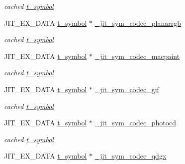 \begin{DoxyCompactItemize}
\begin{DoxyCompactList}\small\item\em cached \hyperlink{structt__symbol}{t\_\-symbol} \item\end{DoxyCompactList}\item 
\hypertarget{group__jitter_ga9e3f5e410192f5386c8ec75b49aa4c5d}{
JIT\_\-EX\_\-DATA \hyperlink{structt__symbol}{t\_\-symbol} $\ast$ \hyperlink{group__jitter_ga9e3f5e410192f5386c8ec75b49aa4c5d}{\_\-jit\_\-sym\_\-codec\_\-planarrgb}}
\label{group__jitter_ga9e3f5e410192f5386c8ec75b49aa4c5d}

\begin{DoxyCompactList}\small\item\em cached \hyperlink{structt__symbol}{t\_\-symbol} \item\end{DoxyCompactList}\item 
\hypertarget{group__jitter_gae0f1922f59cfbe91eb5750726d67df7e}{
JIT\_\-EX\_\-DATA \hyperlink{structt__symbol}{t\_\-symbol} $\ast$ \hyperlink{group__jitter_gae0f1922f59cfbe91eb5750726d67df7e}{\_\-jit\_\-sym\_\-codec\_\-macpaint}}
\label{group__jitter_gae0f1922f59cfbe91eb5750726d67df7e}

\begin{DoxyCompactList}\small\item\em cached \hyperlink{structt__symbol}{t\_\-symbol} \item\end{DoxyCompactList}\item 
\hypertarget{group__jitter_gadd374220c19455f5e7dfca29bf09c36b}{
JIT\_\-EX\_\-DATA \hyperlink{structt__symbol}{t\_\-symbol} $\ast$ \hyperlink{group__jitter_gadd374220c19455f5e7dfca29bf09c36b}{\_\-jit\_\-sym\_\-codec\_\-gif}}
\label{group__jitter_gadd374220c19455f5e7dfca29bf09c36b}

\begin{DoxyCompactList}\small\item\em cached \hyperlink{structt__symbol}{t\_\-symbol} \item\end{DoxyCompactList}\item 
\hypertarget{group__jitter_gae852f97ee9b1de24e37c95b504bb6486}{
JIT\_\-EX\_\-DATA \hyperlink{structt__symbol}{t\_\-symbol} $\ast$ \hyperlink{group__jitter_gae852f97ee9b1de24e37c95b504bb6486}{\_\-jit\_\-sym\_\-codec\_\-photocd}}
\label{group__jitter_gae852f97ee9b1de24e37c95b504bb6486}

\begin{DoxyCompactList}\small\item\em cached \hyperlink{structt__symbol}{t\_\-symbol} \item\end{DoxyCompactList}\item 
\hypertarget{group__jitter_ga7279d3cde3d770e36da997ddabec5024}{
JIT\_\-EX\_\-DATA \hyperlink{structt__symbol}{t\_\-symbol} $\ast$ \hyperlink{group__jitter_ga7279d3cde3d770e36da997ddabec5024}{\_\-jit\_\-sym\_\-codec\_\-qdgx}}
\label{group__jitter_ga7279d3cde3d770e36da997ddabec5024}


\end{DoxyCompactItemize}
